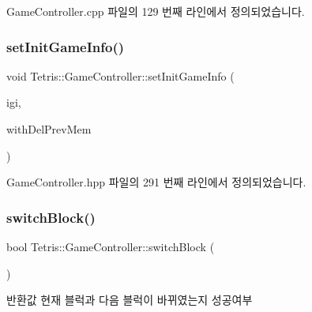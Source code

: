 Game\+Controller.\+cpp 파일의 129 번째 라인에서 정의되었습니다.

\mbox{\label{class_tetris_1_1_game_controller_a0d835f535b48529ca536115dd8123099}} 
\subsubsection{\texorpdfstring{set\+Init\+Game\+Info()}{setInitGameInfo()}\hspace{0.1cm}{\footnotesize\ttfamily [2/2]}}
{\footnotesize\ttfamily void Tetris\+::\+Game\+Controller\+::set\+Init\+Game\+Info (\begin{DoxyParamCaption}\item[{\hyperlink{class_tetris_1_1_init_game_info}{Init\+Game\+Info} $\ast$}]{igi,  }\item[{bool}]{with\+Del\+Prev\+Mem }\end{DoxyParamCaption})\hspace{0.3cm}{\ttfamily [inline]}}



Game\+Controller.\+hpp 파일의 291 번째 라인에서 정의되었습니다.

\mbox{\label{class_tetris_1_1_game_controller_ad203991dc134e2ea36c9c40326da55c1}} 
\subsubsection{\texorpdfstring{switch\+Block()}{switchBlock()}}
{\footnotesize\ttfamily bool Tetris\+::\+Game\+Controller\+::switch\+Block (\begin{DoxyParamCaption}{ }\end{DoxyParamCaption})\hspace{0.3cm}{\ttfamily [inline]}}

\begin{DoxyReturn}{반환값}
현재 블럭과 다음 블럭이 바뀌였는지 성공여부 
\end{DoxyReturn}


